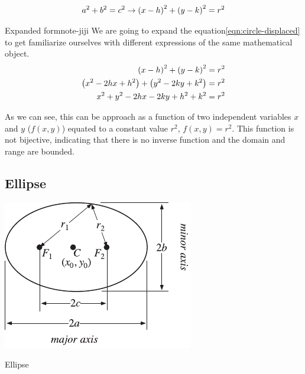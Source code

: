 \documentclass[../main-notes.tex]{subfile}
\begin{document}
\begin{gather}
    a^2 + b^2 = c^2\to\qty(x-h)^2 + \qty(y-k)^2 = r^2
\end{gather}

\begin{note}{Expanded form}{note-jiji}
    We are going to expand the equation\eqref{eqn:circle-displaced} to get familiarize ourselves with different expressions of the same mathematical object.
    \begin{align*}
        \qty(x-h)^2 + \qty(y-k)^2 &= r^2 \\
        \qty(x^2 -2hx + h^2) + \qty(y^2 -2ky + k^2) &= r^2 \\
        x^2 + y^2 -2hx -2ky + h^2 + k^2 &= r^2
    \end{align*}

    As we can see, this can be approach as a function of two independent variables $x$ and $y$ ($f(x,y)$) equated to a constant value $r^2$, $f(x,y)=r^2$.
    This function is not bijective, indicating that there is no inverse function and the domain and range are bounded.

\end{note}


\subsection{Ellipse}

\begin{marginfigure}
    \centering
    \includegraphics[width=\textwidth]{../Figures/ellipse/EllipseBipolar_700.pdf}
    \caption{Ellipse}\label{fig-ellipse-recap}
\end{marginfigure}
\end{document}
